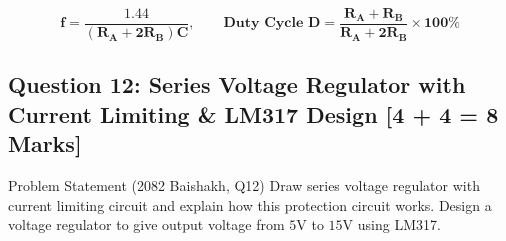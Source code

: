 \documentclass[11pt,a4paper,oneside]{book}
\begin{document}
\begin{answerbox}
$$\mathbf{f = \frac{1.44}{(R_A + 2R_B)C}, \qquad \text{Duty Cycle } D = \frac{R_A + R_B}{R_A + 2R_B} \times 100\%}$$
\end{answerbox}

\vspace{0.6cm}

\subsection{Question 12: Series Voltage Regulator with Current Limiting \& LM317 Design [4 + 4 = 8 Marks]}
\begin{questionbox}{Problem Statement (2082 Baishakh, Q12)}
Draw series voltage regulator with current limiting circuit and explain how this protection circuit works. Design a voltage regulator to give output voltage from $5\text{V}$ to $15\text{V}$ using LM317.
\end{questionbox}
\end{document}
